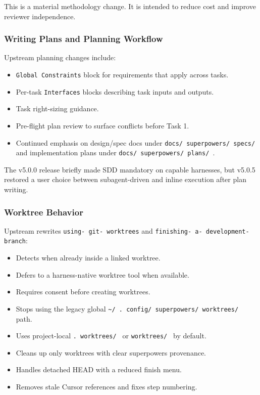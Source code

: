 \documentclass[twocolumn,10pt,letterpaper]{article}
\begin{document}
This is a material methodology change. It is intended to reduce cost and improve reviewer independence.


\subsubsection{Writing Plans and Planning Workflow}

Upstream planning changes include:


\begin{itemize}
\setlength{\itemsep}{0pt}
\setlength{\parskip}{0pt}
  \item \texttt{Global Constraints} block for requirements that apply across tasks.
  \item Per-task \texttt{Interfaces} blocks describing task inputs and outputs.
  \item Task right-sizing guidance.
  \item Pre-flight plan review to surface conflicts before Task 1.
  \item Continued emphasis on design/spec docs under \texttt{docs/ superpowers/ specs/ } and implementation plans under \texttt{docs/ superpowers/ plans/ }.
\end{itemize}

The v5.0.0 release briefly made SDD mandatory on capable harnesses, but v5.0.5 restored a user choice between subagent-driven and inline execution after plan writing.


\subsubsection{Worktree Behavior}

Upstream rewrites \texttt{using- git- worktrees} and \texttt{finishing- a- development- branch}:


\begin{itemize}
\setlength{\itemsep}{0pt}
\setlength{\parskip}{0pt}
  \item Detects when already inside a linked worktree.
  \item Defers to a harness-native worktree tool when available.
  \item Requires consent before creating worktrees.
  \item Stops using the legacy global \texttt{\textasciitilde{}/ . config/ superpowers/ worktrees/ } path.
  \item Uses project-local \texttt{. worktrees/ } or \texttt{worktrees/ } by default.
  \item Cleans up only worktrees with clear superpowers provenance.
  \item Handles detached HEAD with a reduced finish menu.
  \item Removes stale Cursor references and fixes step numbering.
\end{itemize}
\end{document}
